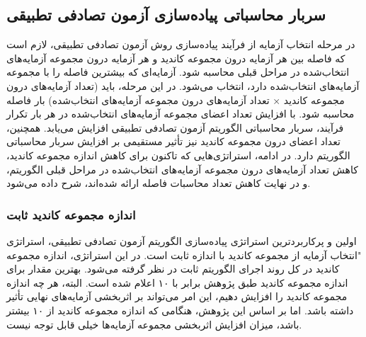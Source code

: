\subsection{سربار محاسباتی پیاده‌سازی آزمون تصادفی تطبیقی}
در مرحله انتخاب آزمایه از فرآیند پیاده‌سازی روش آزمون تصادفی تطبیقی، لازم است که فاصله بین هر آزمایه درون مجموعه کاندید و هر آزمایه درون مجموعه آزمایه‌های انتخاب‌شده در مراحل قبلی محاسبه شود. آزمایه‌ای که بیشترین فاصله را با مجموعه آزمایه‌های انتخاب‌شده دارد، انتخاب می‌شود. در این مرحله، باید (تعداد آزمایه‌های درون مجموعه کاندید × تعداد آزمایه‌های درون مجموعه آزمایه‌های انتخاب‌شده) بار فاصله محاسبه شود. با افزایش تعداد اعضای مجموعه آزمایه‌های انتخاب‌شده در هر بار تکرار فرآیند، سربار محاسباتی الگوریتم آزمون تصادفی تطبیقی افزایش می‌یابد. همچنین، تعداد اعضای درون مجموعه کاندید نیز تأثیر مستقیمی بر افزایش سربار محاسباتی الگوریتم دارد. در ادامه، استراتژی‌هایی که تاکنون برای کاهش اندازه مجموعه کاندید، کاهش تعداد آزمایه‌های درون مجموعه آزمایه‌های انتخاب‌شده در مراحل قبلی الگوریتم، و در نهایت کاهش تعداد محاسبات فاصله ارائه شده‌اند، شرح داده می‌شود.

\subsubsection{اندازه مجموعه کاندید ثابت}
اولین و پرکاربردترین استراتژی پیاده‌سازی الگوریتم آزمون تصادفی تطبیقی، استراتژی "انتخاب آزمایه از مجموعه کاندید با اندازه ثابت\cite{chen2001proportional} است. در این استراتژی، اندازه مجموعه کاندید در کل روند اجرای الگوریتم ثابت در نظر گرفته می‌شود. بهترین مقدار برای اندازه مجموعه کاندید طبق پژوهش \cite{chen2005adaptive} برابر با ۱۰ اعلام شده است. البته، هر چه اندازه مجموعه کاندید را افزایش دهیم، این امر می‌تواند بر اثربخشی آزمایه‌های نهایی تأثیر داشته باشد. اما بر اساس این پژوهش، هنگامی که اندازه مجموعه کاندید از ۱۰ بیشتر باشد، میزان افزایش اثربخشی مجموعه آزمایه‌ها خیلی قابل توجه نیست.

